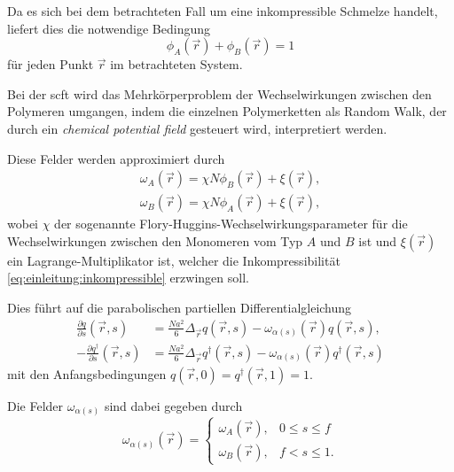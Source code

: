 Da es sich bei dem betrachteten Fall um eine inkompressible Schmelze handelt,
liefert dies die notwendige Bedingung
\begin{equation}
\label{eq:einleitung:inkompressible}
    \phi_{A}(\vec{r}) + \phi_{B}(\vec{r}) = 1
\end{equation}
für jeden Punkt $\vec{r}$ im betrachteten System.

Bei der \ac{scft} wird das Mehrkörperproblem der Wechselwirkungen zwischen den Polymeren umgangen, indem die einzelnen Polymerketten als Random Walk, der durch ein \emph{chemical potential field} gesteuert wird, interpretiert werden.

Diese Felder werden approximiert durch
\begin{equation}
\label{eq:einleitung:felder}
    \begin{aligned}
        \omega_{A}(\vec{r}) = \chi N \phi_{B}(\vec{r}) + \xi(\vec{r}),\\
        \omega_{B}(\vec{r}) = \chi N \phi_{A}(\vec{r}) + \xi(\vec{r}),
    \end{aligned}
\end{equation}
wobei $\chi$ der sogenannte Flory-Huggins-Wechselwirkungsparameter für die Wechselwirkungen zwischen den Monomeren vom Typ $A$ und $B$ ist und $\xi(\vec{r})$ ein Lagrange-Multiplikator ist, welcher die Inkompressibilität \eqref{eq:einleitung:inkompressible} erzwingen soll.


Dies führt auf die parabolischen partiellen Differentialgleichung
\begin{equation}
\label{eq:einleitung:mde}
    \begin{aligned}
        \frac{\partial q}{\partial s}(\vec{r}, s) &= \frac{N a^{2}}{6} \Delta_{\vec{r}} q(\vec{r}, s) - \omega_{\alpha(s)}(\vec{r}) q(\vec{r}, s),\\
        -\frac{\partial q^{\dagger}}{\partial s}(\vec{r}, s) &= \frac{N a^{2}}{6} \Delta_{\vec{r}} q^{\dagger}(\vec{r}, s) - \omega_{\alpha(s)}(\vec{r}) q^{\dagger}(\vec{r}, s)
    \end{aligned}
\end{equation}
mit den Anfangsbedingungen $q(\vec{r}, 0) = q^{\dagger}(\vec{r}, 1) = 1$.

Die Felder $\omega_{\alpha(s)}$ sind dabei gegeben durch
\begin{equation}
    \omega_{\alpha(s)}(\vec{r}) = \begin{cases}
        \omega_{A}(\vec{r}), & 0 \leq s \leq f\\
        \omega_{B}(\vec{r}), & f < s \leq 1.
    \end{cases}
\end{equation}

